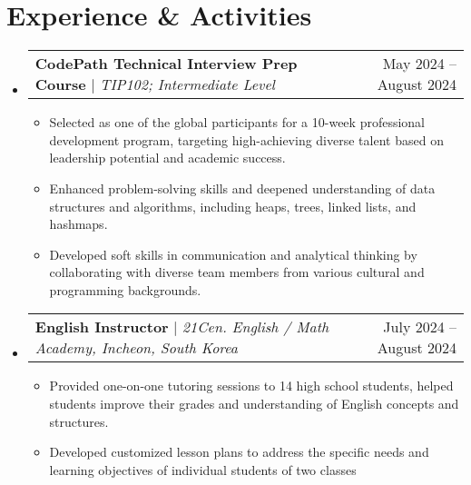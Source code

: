 \documentclass[letterpaper,11pt]{article}
\makeatletter
\newcommand{\resumeItem}[1]{
  \item\small{
    {#1 \vspace{-3pt}}
  }
}
\newcommand{\resumeSubheading}[4]{
  \vspace{-2pt}\item
    \begin{tabular*}{0.97\textwidth}[t]{l@{\extracolsep{\fill}}r@{\hspace{-0.2in}}}
        \textbf{#1} & #2 \\
        \textit{\small#3} & \textit{\small #4} \\
    \end{tabular*}\vspace{-1pt}
}
\newcommand{\resumeProjectHeading}[2]{
    \item
    \begin{tabular*}{0.97\textwidth}{l@{\extracolsep{\fill}}r@{\hspace{-0.2in}}}
        \small#1 & #2 \\
    \end{tabular*}\vspace{-7pt}
}
\newcommand{\resumeSubHeadingListStart}{\begin{itemize}[leftmargin=0.00in, rightmargin=-0.2in, label={}]}
\newcommand{\resumeSubHeadingListEnd}{\end{itemize}}
\newcommand{\resumeItemListStart}{\begin{itemize}[leftmargin=0.15in, rightmargin=0.15in]}
\newcommand{\resumeItemListEnd}{\end{itemize}\vspace{-7pt}}
\makeatother
\begin{document}



\section{Experience \& Activities}
    \resumeSubHeadingListStart
        \resumeProjectHeading
            {\textbf{CodePath Technical Interview Prep Course} $|$ \emph{TIP102; Intermediate Level}}{May 2024 -- August 2024}
            \resumeItemListStart
                \resumeItem{Selected as one of the global participants for a 10-week professional development program, targeting high-achieving diverse talent based on leadership potential and academic success.}
                \resumeItem{Enhanced problem-solving skills and deepened understanding of data structures and algorithms, including heaps, trees, linked lists, and hashmaps.}
                \resumeItem{Developed soft skills in communication and analytical thinking by collaborating with diverse team members from various cultural and programming backgrounds.}
                \resumeItemListEnd
        \resumeSubHeadingListEnd

    \resumeSubHeadingListStart
        \resumeProjectHeading
            {\textbf{English Instructor} $|$ \emph{21Cen. English / Math Academy, Incheon, South Korea}}{July 2024 -- August 2024}
            \resumeItemListStart
                \resumeItem{Provided one-on-one tutoring sessions to 14 high school students, helped students improve their grades and understanding of English concepts and structures.}
                \resumeItem{Developed customized lesson plans to address the specific needs and learning objectives of individual students of two classes}
            \resumeItemListEnd
        \resumeSubHeadingListEnd
\end{document}
